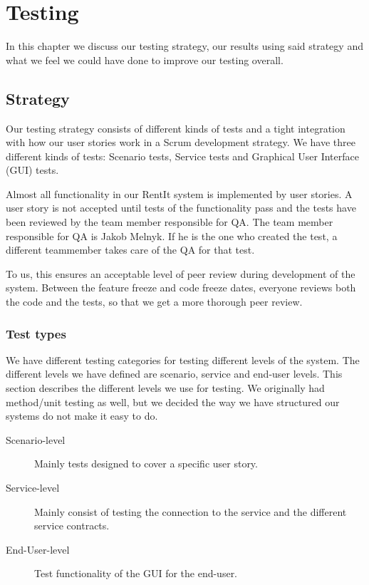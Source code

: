 \chapter{Testing}
\label{testing}
In this chapter we discuss our testing strategy, our results using said strategy and what we feel we could have done to improve our testing overall. 

\section{Strategy}
\label{testing_strategy}
Our testing strategy consists of different kinds of tests and a tight integration with how our user stories work in a Scrum development strategy. We have three different kinds of tests: Scenario tests, Service tests and Graphical User Interface (GUI) tests. 

Almost all functionality in our RentIt system is implemented by user stories. A user story is not accepted until tests of the functionality pass and the tests have been reviewed by the team member responsible for QA. The team member responsible for QA is Jakob Melnyk. If he is the one who created the test, a different teammember takes care of the QA for that test.

To us, this ensures an acceptable level of peer review during development of the system. Between the feature freeze and code freeze dates, everyone reviews both the code and the tests, so that we get a more thorough peer review.

\subsection{Test types}
\label{testing_strategy_types}
We have different testing categories for testing different levels of the system. The different levels we have defined are scenario, service and end-user levels. This section describes the different levels we use for testing. We originally had method/unit testing as well, but we decided the way we have structured our systems do not make it easy to do.

\begin{description}
\item[Scenario-level]Mainly tests designed to cover a specific user story.
\item[Service-level]Mainly consist of testing the connection to the service and the different service contracts.
\item[End-User-level]Test functionality of the GUI for the end-user.
\end{description}

